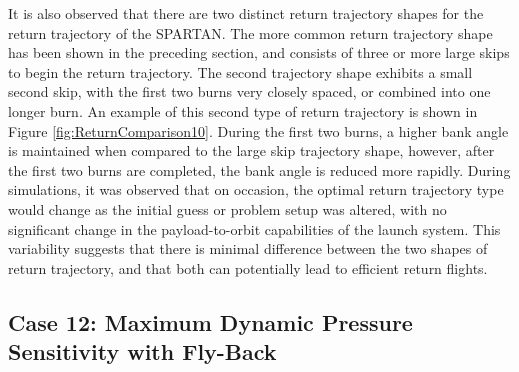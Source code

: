 It is also observed that there are two distinct return trajectory shapes for the return trajectory of the SPARTAN. The more common return trajectory shape has been shown in the preceding section, and consists of three or more large skips to begin the return trajectory. The second trajectory shape exhibits a small second skip, with the first two burns very closely spaced, or combined into one longer burn. An example of this second type of return trajectory is shown in Figure \ref{fig:ReturnComparison10}. During the first two burns, a higher bank angle is maintained when compared to the large skip trajectory shape, however, after the first two burns are completed, the bank angle is reduced more rapidly. 
During simulations, it was observed that on occasion, the optimal return trajectory type would change as the initial guess or problem setup was altered, with no significant change in the payload-to-orbit capabilities of the launch system. This variability suggests that there is minimal difference between the two shapes of return trajectory, and that both can potentially lead to efficient return flights. 





\subsection{Case 12: Maximum Dynamic Pressure Sensitivity with Fly-Back}

